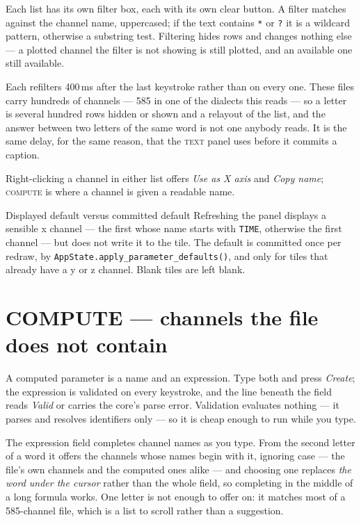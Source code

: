 \documentclass[11pt,a4paper,oneside]{report}
\newcommand{\code}[1]{\texttt{#1}}
\newcommand{\tab}[1]{\textsc{#1}}
\begin{document}
Each list has its own filter box, each with its own clear button. A filter
matches against the channel name, uppercased; if the text contains \code{*} or
\code{?} it is a wildcard pattern, otherwise a substring test. Filtering hides
rows and changes nothing else --- a plotted channel the filter is not showing
is still plotted, and an available one still available.

Each refilters 400\,ms after the last keystroke rather than on every one.
These files carry hundreds of channels --- 585 in one of the dialects this
reads --- so a letter is several hundred rows hidden or shown and a relayout of
the list, and the answer between two letters of the same word is not one
anybody reads. It is the same delay, for the same reason, that the \tab{text}
panel uses before it commits a caption.

Right-clicking a channel in either list offers \emph{Use as X axis} and
\emph{Copy name}; \tab{compute} is where a channel is given a readable name.

\begin{aoenote}{Displayed default versus committed default}
Refreshing the panel displays a sensible x channel --- the first whose name
starts with \code{TIME}, otherwise the first channel --- but does not write it to
the tile. The default is committed once per redraw, by
\code{AppState.apply\_parameter\_defaults()}, and only for tiles that already
have a y or z channel. Blank tiles are left blank.
\end{aoenote}

\section{COMPUTE --- channels the file does not contain}

A computed parameter is a name and an expression. Type both and press
\emph{Create}; the expression is validated on every keystroke, and the line
beneath the field reads \emph{Valid} or carries the core's parse error.
Validation evaluates nothing --- it parses and resolves identifiers only --- so
it is cheap enough to run while you type.

The expression field completes channel names as you type. From the second
letter of a word it offers the channels whose names begin with it, ignoring
case --- the file's own channels and the computed ones alike --- and choosing
one replaces \emph{the word under the cursor} rather than the whole field, so
completing in the middle of a long formula works. One letter is not enough to
offer on: it matches most of a 585-channel file, which is a list to scroll
rather than a suggestion.
\end{document}
